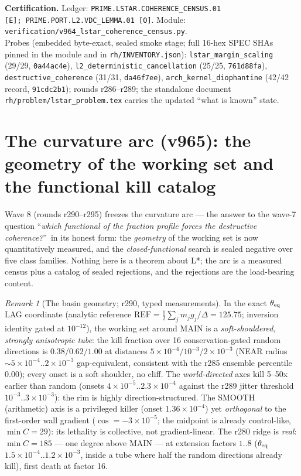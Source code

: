 \documentclass[11pt]{article}
\newcommand{\certbox}[3]{%
  \par\medskip\noindent\colorbox{certgray}{\parbox{\dimexpr\linewidth-2\fboxsep}{%
    \footnotesize\raggedright\textbf{Certification.} Ledger: \texttt{#1}.\quad
    Module: \texttt{#2}.\\ #3}}\par\medskip}
\theoremstyle{definition}
\theoremstyle{remark}
\newtheorem{remark}[theorem]{Remark}
\begin{document}
\certbox{PRIME.LSTAR.COHERENCE\_CENSUS.01 [E];\
PRIME.PORT.L2.VDC\_LEMMA.01 [O]}%
{verification/v964\_lstar\_coherence\_census.py}%
{Probes (embedded byte-exact, sealed smoke stage; full 16-hex SPEC SHAs
pinned in the module and in \texttt{rh/INVENTORY.json}):
\texttt{lstar\_margin\_scaling} (29/29, \texttt{0a44ac4e}),
\texttt{l2\_deterministic\_cancellation} (25/25, \texttt{761d88fa}),
\texttt{destructive\_coherence} (31/31, \texttt{da46f7ee}),
\texttt{arch\_kernel\_diophantine} (42/42 record, \texttt{91cdc2b1});
rounds r286--r289; the standalone document
\texttt{rh/problem/lstar\_problem.tex} carries the updated
``what is known'' state.}

\section{The curvature arc (v965): the geometry of the working set and
the functional kill catalog}\label{sec:curvature}

Wave 8 (rounds r290--r295) freezes the curvature arc --- the answer to
the wave-7 question ``\emph{which functional of the fraction profile
forces the destructive coherence?}''\ in its honest form: the
\emph{geometry} of the working set is now quantitatively measured, and
the \emph{closed-functional} search is sealed negative over five class
families.  Nothing here is a theorem about L*; the arc is a measured
census plus a catalog of sealed rejections, and the rejections are the
load-bearing content.

\begin{remark}[The basin geometry; r290, typed measurements]
\label{rem:basin}
In the exact $\theta_{\rm eq}$ LAG coordinate (analytic reference
$\mathrm{REF} = \frac12\sum_j m_jg_j/\Delta = 125.75$; inversion
identity gated at $10^{-12}$), the working set around MAIN is a
\emph{soft-shouldered, strongly anisotropic tube}: the kill fraction
over 16 conservation-gated random directions is $0.38/0.62/1.00$ at
distances $5\times10^{-4}/10^{-3}/2\times10^{-3}$ (NEAR radius
$\sim5\times10^{-4}..2\times10^{-3}$ gap-equivalent, consistent with
the r285 ensemble percentile $0.00$); every onset is a soft shoulder,
no cliff.  The \emph{world-directed} axes kill 5--50x earlier than
random (onsets $4\times10^{-5}..2.3\times10^{-4}$ against the r289
jitter threshold $10^{-3}..3\times10^{-3}$): the rim is highly
direction-structured.  The SMOOTH (arithmetic) axis is a privileged
killer (onset $1.36\times10^{-4}$) yet \emph{orthogonal} to the
first-order wall gradient ($\cos = -3\times10^{-5}$; the midpoint is
already control-like, $\min C = 29$): its lethality is collective, not
gradient-linear.  The r280 ridge is \emph{real}: $\min C = 185$ ---
one degree above MAIN --- at extension factors $1..8$
($\theta_{\rm eq}$ $1.5\times10^{-4}..1.2\times10^{-3}$, inside a tube
where half the random directions already kill), first death at factor
16.
\end{remark}
\end{document}
